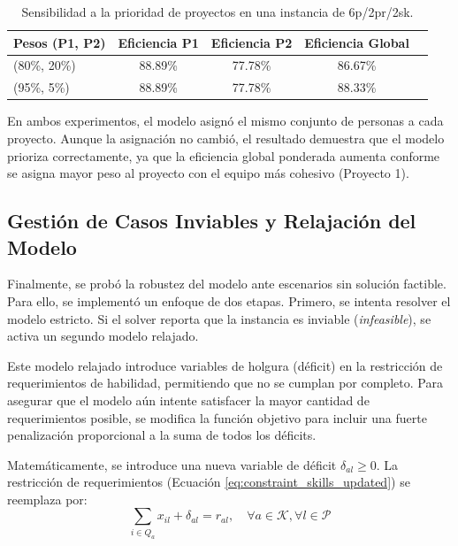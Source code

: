 \documentclass[conference]{IEEEtran}
\begin{document}
\begin{table}[htbp]
    \centering
    \caption{Sensibilidad a la prioridad de proyectos en una instancia de 6p/2pr/2sk.}
    \label{tab:sensibilidad}
    \begin{tabularx}{\linewidth}{@{}lcccc@{}}
        \toprule
        \textbf{Pesos (P1, P2)} & \textbf{Eficiencia P1} & \textbf{Eficiencia P2} & \textbf{Eficiencia Global} \\
        \midrule
        (80\%, 20\%)            & 88.89\%                & 77.78\%                & 86.67\%                    \\
        (95\%, 5\%)             & 88.89\%                & 77.78\%                & 88.33\%                    \\
        \bottomrule
    \end{tabularx}
\end{table}

En ambos experimentos, el modelo asignó el mismo conjunto de personas a cada proyecto. Aunque la asignación no cambió, el resultado demuestra que el modelo prioriza correctamente, ya que la eficiencia global ponderada aumenta conforme se asigna mayor peso al proyecto con el equipo más cohesivo (Proyecto 1).

\subsection{Gestión de Casos Inviables y Relajación del Modelo}
Finalmente, se probó la robustez del modelo ante escenarios sin solución factible. Para ello, se implementó un enfoque de dos etapas. Primero, se intenta resolver el modelo estricto. Si el solver reporta que la instancia es inviable (\textit{infeasible}), se activa un segundo modelo relajado.

Este modelo relajado introduce variables de holgura (déficit) en la restricción de requerimientos de habilidad, permitiendo que no se cumplan por completo. Para asegurar que el modelo aún intente satisfacer la mayor cantidad de requerimientos posible, se modifica la función objetivo para incluir una fuerte penalización proporcional a la suma de todos los déficits.

Matemáticamente, se introduce una nueva variable de déficit \(\delta_{al} \geq 0\). La restricción de requerimientos (Ecuación \ref{eq:constraint_skills_updated}) se reemplaza por:
\begin{equation}
    \sum_{i \in Q_a} x_{il} + \delta_{al} = r_{al}, \quad \forall a \in \mathcal{K}, \forall l \in \mathcal{P}
    \label{eq:constraint_skills_relaxed}
\end{equation}
\end{document}
